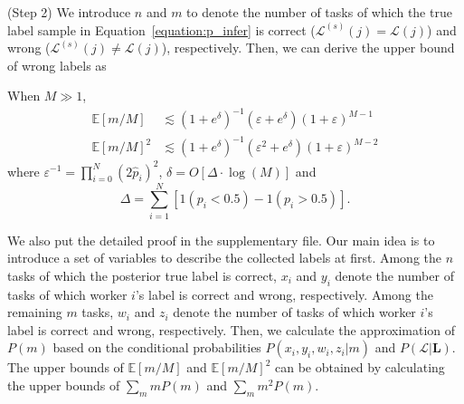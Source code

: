 (Step 2) We introduce $n$ and $m$ to denote the number of tasks of which the true label sample in Equation~\ref{equation:p_infer} is correct ($\mathcal{L}^{(s)}(j)=\mathcal{L}(j)$) and wrong ($\mathcal{L}^{(s)}(j)\neq \mathcal{L}(j)$), respectively.
 Then, we can derive the upper bound of wrong labels as
\begin{theorem}
\label{ConvBound}
When $M\gg 1$,
\begin{align}
\mathbb{E}[m/M]&\lesssim (1+e^{\delta})^{-1}(\varepsilon+e^{\delta})(1+\varepsilon)^{M-1}\label{equation:CB1}\\
\mathbb{E}[m/M]^2&\lesssim (1+e^{\delta})^{-1}(\varepsilon^2+e^{\delta})(1+\varepsilon)^{M-2}\label{equation:CB2}
\end{align}
where $\varepsilon^{-1}=\prod_{i=0}^{N}(2\hat{p}_i)^{2}$, $\delta=O[\Delta\cdot \log(M)]$ and 
$$\Delta={\sum}_{i=1}^N[1(p_i<0.5)-1(p_i>0.5)].$$
\end{theorem}
We also put the detailed proof in the supplementary file.
Our main idea is to introduce a set of variables to describe the collected labels at first.
Among the $n$ tasks of which the posterior true label is correct, $x_i$ and $y_i$ denote the number of tasks of which worker $i$'s label is correct and wrong, respectively.
Among the remaining $m$ tasks, $w_i$ and $z_i$ denote the number of tasks of which worker $i$'s label is correct and wrong, respectively.
Then, we calculate the approximation of $P(m)$ based on the conditional probabilities $P(x_i,y_i,w_i, z_i|m)$ and $P(\mathcal{L}|\bm{L})$.
The upper bounds of $\mathbb{E}[m/M]$ and $\mathbb{E}[m/M]^2$ can be obtained by calculating the upper bounds of $\sum_{m}m P(m)$ and $\sum_{m} m^2P(m)$.

